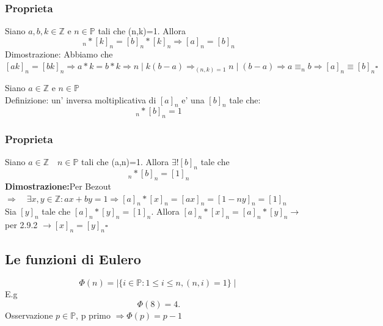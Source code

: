 \documentclass{article}
\begin{document}
     \subsubsection{Proprieta}
     \begin{flushleft}
      Siano $a,b,k \in \mathbb{Z}$ e $n \in \mathbb{P}$ tali che (n,k)=1. Allora
       \begin{equation}
        [a]_n*[k]_n=[b]_n*[k]_n \Rightarrow [a]_n=[b]_n 
       \end{equation}
       Dimostrazione: Abbiamo che \\
       $[ak]_n=[bk]_n \Rightarrow a*k=b*k \Rightarrow n\mid k(b-a) \Rightarrow_{(n,k)=1}n\mid (b-a) \Rightarrow a \equiv_n b \Rightarrow [a]_n \equiv [b]_n \square$
     \end{flushleft}
     \begin{flushleft}
       Siano $a \in \mathbb{Z}$ e $n \in \mathbb{P}$ \\ 
       Definizione: un' inversa moltiplicativa di $[a]_n$ e' una $[b]_n$ tale che:
       \begin{equation}
         [a]_n*[b]_n=1
       \end{equation}
     \end{flushleft}
     \subsubsection{Proprieta}
     \begin{flushleft}
       Siano $a \in \mathbb{Z} \quad n \in \mathbb{P}$ tali che (a,n)=1. Allora $\exists ! [b]_n$ tale che
       \begin{equation}
         [a]_n*[b]_n=[1]_n
       \end{equation}
       \textbf{Dimostrazione:}Per Bezout $\Rightarrow \quad \exists x,y \in \mathbb{Z}: ax+by=1 \Rightarrow [a]_n*[x]_n = [ax]_n=[1-ny]_n=[1]_n$ \\ 
       Sia $[y]_n$ tale che $[a]_n*[y]_n=[1]_n$. Allora $[a]_n *[x]_n=[a]_n*[y]_n \to$ per 2.9.2 $\to [x]_n=[y]_n \square$
     \end{flushleft}
     \subsection{Le funzioni di Eulero}
     \begin{flushleft}
       \begin{equation}
         \Phi (n)=\mid \{ i\in \mathbb{P}: 1 \leq i \leq n, (n,i)=1\}\mid
       \end{equation}
       E.g
       \begin{equation}
         \Phi (8) =4.
       \end{equation}
       Osservazione $p\in \mathbb{P}$, p primo $\Rightarrow \Phi (p)=p-1$
     \end{flushleft}
\end{document}
